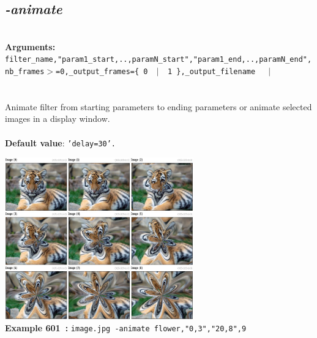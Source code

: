 \documentclass[a4paper,11pt,twoside]{book}
\begin{document}
\subsection{\emph{-animate} }\vspace*{-0.5em}
~\\\textbf{Arguments: } 
{\small \texttt{filter\_name,"param1\_start,..,paramN\_start","param1\_end,..,paramN\_end",nb\_frames$>$=0,\_output\_frames=\{ 0 ~$|$~ 1 \},\_output\_filename}}~~~$|$\\
\\~\\
Animate filter from starting parameters to ending parameters or animate selected images
in a display window.
~\\~\\\textbf{Default value}: {\small \texttt{'delay=30'.}}
\begin{center}\includegraphics[keepaspectratio=true,height=7cm,width=\textwidth]{img/gmic_def601.jpg}\\
{\footnotesize \textbf{Example 601~:} \texttt{image.jpg -animate flower,"0,3","20,8",9}}
\end{center}
\end{document}
